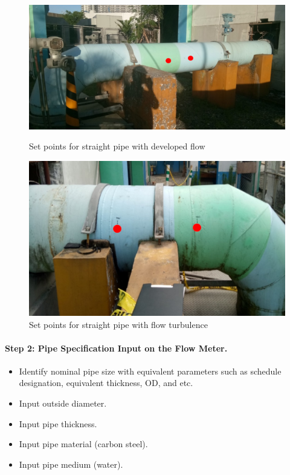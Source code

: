 \begin{figure}[ht]
	\begin{minipage}[b]{0.5\linewidth}
		\centering
		\includegraphics[width=\textwidth]{figures/ch02_flowmeasurement01}
		\caption{Set points for straight pipe with developed flow}
				\label{ch02_flowmeasurement01}
	\end{minipage}
	\hspace{0.05cm}
	\begin{minipage}[b]{0.5\linewidth}
		\centering
		\includegraphics[width=\textwidth]{figures/ch02_flowmeasurement02}
		\caption{Set points for straight pipe with flow turbulence}
				\label{ch02_flowmeasurement02}
	\end{minipage}
\end{figure}



\paragraph{Step 2: Pipe Specification Input on the Flow Meter.}
\begin{itemize}
\item Identify nominal pipe size with equivalent parameters such as schedule designation, equivalent thickness, OD, and etc.
\item Input outside diameter.
\item Input pipe thickness.
\item Input pipe material (carbon steel).
\item Input pipe medium (water).

\end{itemize}

